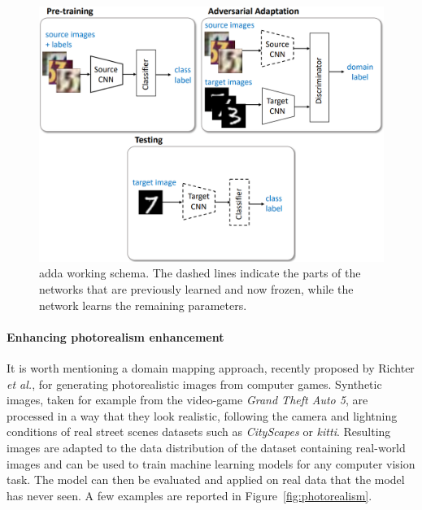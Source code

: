 \documentclass[%
    corpo=12pt,
    twoside,
    stile=classica,   
    tipotesi=magistrale,
    evenboxes,
    english,
	numerazioneromana,
]{toptesi}
\begin{document}
\begin{figure}[ht!]
	\centering
	\includegraphics[width=.75\linewidth]{imgs/adda.png}
	\caption[\acrshort{adda} working schema]{\acrshort{adda} working schema\cite{tzeng2017adversarial}. The dashed lines indicate the parts of the networks that are previously learned and now frozen, while the network learns the remaining parameters.}
	\label{fig:adda}
\end{figure}

\paragraph{Enhancing photorealism enhancement}
It is worth mentioning a domain mapping approach, recently proposed by Richter \textit{et al.}\cite{richter2021enhancing}, for generating photorealistic images from computer games. Synthetic images, taken for example from the video-game \textit{Grand Theft Auto 5}, are processed in a way that they look realistic, following the camera and lightning conditions of real street scenes datasets such as \textit{CityScapes} or \textit{\gls{kitti}}. Resulting images are adapted to the data distribution of the dataset containing real-world images and can be used to train machine learning models for any computer vision task. The model can then be evaluated and applied on real data that the model has never seen. A few examples are reported in Figure~\ref{fig:photorealism}.
\end{document}
